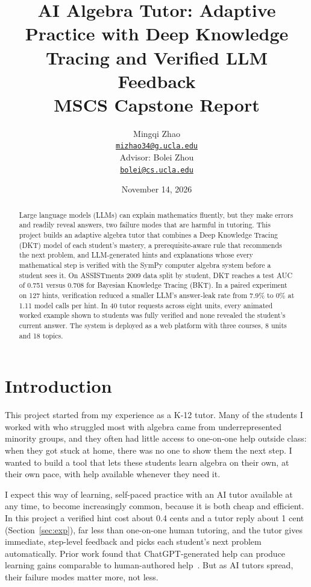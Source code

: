 \documentclass[11pt]{article}
\title{\textbf{AI Algebra Tutor: Adaptive Practice with Deep Knowledge Tracing and Verified LLM Feedback}\\[4pt]
\large MSCS Capstone Report}
\author{Mingqi Zhao\\ \small\href{mailto:mizhao34@g.ucla.edu}{\texttt{mizhao34@g.ucla.edu}}\\[6pt]
\small Advisor: Bolei Zhou\\ \small\href{mailto:bolei@cs.ucla.edu}{\texttt{bolei@cs.ucla.edu}}}
\date{November 14, 2026}
\begin{document}
\maketitle

\begin{abstract}
Large language models (LLMs) can explain mathematics fluently, but they make errors and readily reveal answers, two failure modes that are harmful in tutoring. This project builds an adaptive algebra tutor that combines a Deep Knowledge Tracing (DKT) model of each student's mastery, a prerequisite-aware rule that recommends the next problem, and LLM-generated hints and explanations whose every mathematical step is verified with the SymPy computer algebra system before a student sees it. On ASSISTments 2009 data split by student, DKT reaches a test AUC of 0.751 versus 0.708 for Bayesian Knowledge Tracing (BKT). In a paired experiment on 127 hints, verification reduced a smaller LLM's answer-leak rate from 7.9\% to 0\% at 1.11 model calls per hint. In 40 tutor requests across eight units, every animated worked example shown to students was fully verified and none revealed the student's current answer. The system is deployed as a web platform with three courses, 8 units and 18 topics.
\end{abstract}

\section{Introduction}
This project started from my experience as a K-12 tutor. Many of the students I worked with who struggled most with algebra came from underrepresented minority groups, and they often had little access to one-on-one help outside class: when they got stuck at home, there was no one to show them the next step. I wanted to build a tool that lets these students learn algebra on their own, at their own pace, with help available whenever they need it.

I expect this way of learning, self-paced practice with an AI tutor available at any time, to become increasingly common, because it is both cheap and efficient. In this project a verified hint cost about 0.4 cents and a tutor reply about 1 cent (Section~\ref{sec:exp}), far less than one-on-one human tutoring, and the tutor gives immediate, step-level feedback and picks each student's next problem automatically. Prior work found that ChatGPT-generated help can produce learning gains comparable to human-authored help~\cite{pardos2024chatgpt}. But as AI tutors spread, their failure modes matter more, not less.
\end{document}
